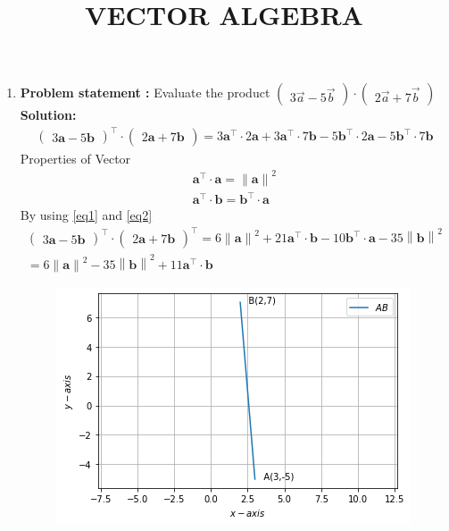 \documentclass[12pt]{article}\usepackage{graphicx}
\title{\mytitle}
\newcommand{\myvec}[1]{\ensuremath{\begin{pmatrix}#1\end{pmatrix}}}
\let\vec\mathbf
\let\vec\mathbf
\providecommand{\norm}[1]{\left\lVert#1\right\rVert}
\newcommand{\solution}{\noindent \textbf{Solution: }}
\begin{document}
\begin{center}
\title{\textbf{VECTOR ALGEBRA}}
\maketitle
\end{center}
\begin{enumerate}
\item\textbf{Problem statement :} Evaluate the product $\myvec{3\overrightarrow{a}-5\overrightarrow{b}}\cdot\myvec{2\overrightarrow{a}+7\overrightarrow{b}}$
\solution
\begin{align}
    \myvec{3\vec{a}-5\vec{b}}^\top\cdot\myvec{2\vec{a}+7\vec{b}}= 3\vec{a}^\top\cdot2\vec{a}+3\vec{a}^\top\cdot7\vec{b}-5\vec{b}^\top\cdot2\vec{a}-5\vec{b}^\top\cdot7\vec{b}
\end{align}
Properties of Vector
\begin{align}
    \vec{a}^\top\cdot\vec{a} = \norm{\vec{a}}^2
    \label{eq1}  
    \\
    \vec{a}^\top\cdot\vec{b} = \vec{b}^\top\cdot\vec{a}
    \label{eq2}
\end{align}
By using \eqref{eq1} and \eqref{eq2}
\begin{align}
    \myvec{3\vec{a}-5\vec{b}}^\top\cdot\myvec{2\vec{a}+7\vec{b}}^\top = 6\norm{\vec{a}}^2 +21\vec{a}^\top\cdot\vec{b}-10\vec{b}^\top\cdot\vec{a}-35\norm{\vec{b}}^2 \\
     =6\norm{\vec{a}}^2-35\norm{\vec{b}}^2+11\vec{a}^\top\cdot\vec{b}
\end{align}
\begin{figure}[!h]
 \begin{center}
  \includegraphics[width=\columnwidth]{./fig.png}
 \end{center}
\caption{}
\label{fig:Fig1}
\end{figure}
\end{enumerate}
\end{document}

